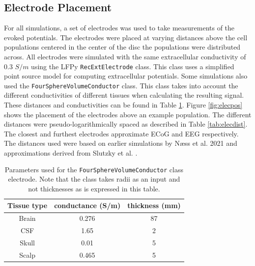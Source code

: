 \documentclass[final, a4paper,masters,en,listoffigures,listoftables,norwegiandates]{NMBU}
\begin{document}
\subsection{Electrode Placement}\label{subsec:Electrodes}
For all simulations, a set of electrodes was used to take measurements of the evoked potentials. The electrodes were placed at varying distances above the cell populations centered in the center of the disc the populations were distributed across. All electrodes were simulated with the same extracellular conductivity of 0.3 $S/m$ using the LFPy \texttt{RecExtElectrode} class. This class uses a simplified point source model for computing extracellular potentials. Some simulations also used the \newline \texttt{FourSphereVolumeConductor} class. This class takes into account the different conductivities of different tissues when calculating the resulting signal. These distances and conductivities can be found in Table \ref{tab:foursphereparams}. Figure \ref{fig:elecpos} shows the placement of the electrodes above an example population. The different distances were pseudo-logarithmically spaced as described in Table \ref{tab:elecdist}. The closest and furthest electrodes approximate ECoG and EEG respectively. The distances used were based on earlier simulations by Næss et al. 2021 \cite{Naess2021} and approximations derived from Slutzky et al. \cite{Slutzky2010}.

\begin{table}[h]
    \centering
    \begin{tabular}{|c|c|c|}
        \hline
        Tissue type & conductance (S/m) & thickness (mm) \\
        \hline
        Brain & 0.276 & 87 \\
        \hline
        CSF & 1.65 & 2 \\
        \hline
        Skull & 0.01 & 5 \\
        \hline
        Scalp & 0.465 & 5 \\
        \hline
    \end{tabular}
    \caption{Parameters used for the \texttt{FourSphereVolumeConductor} class electrode. Note that the class takes radii as an input and not thicknesses as is expressed in this table.}
    \label{tab:foursphereparams}
\end{table}
\end{document}

